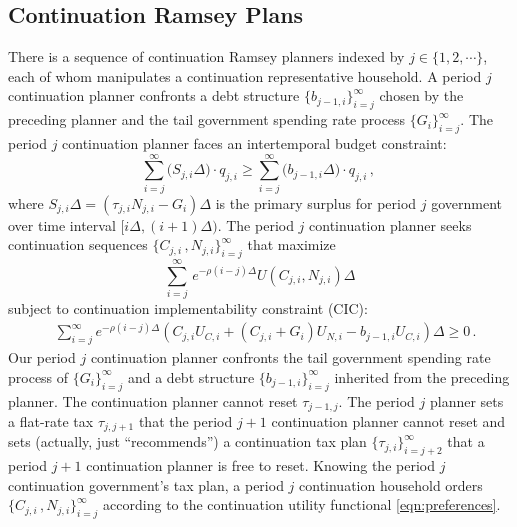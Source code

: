 \documentclass[12pt]{article}
\newcommand{\NW}[1]{{\textcolor{blue}{#1}}}
\newcommand{\TS}[1]{{\textcolor{magenta}{#1}}}
\begin{document}
	
	\subsection{Continuation Ramsey Plans} \label{subsec32}
	
	
	There is a sequence of continuation Ramsey planners indexed by $j\in \{1, 2, \cdots \}$, each of whom %
	manipulates   a  continuation representative household. %
	A period $j$ continuation planner  confronts a debt structure {$\{ b_{j-1,i}\}_{i=j}^\infty$} chosen by the preceding  planner and the tail government spending rate process {$\{ G_{i}\}_{i=j}^\infty$}. 
	The period $j$ continuation planner  faces an intertemporal budget constraint:
	\begin{equation}\label{ic} %
			\sum_{i=j}^\infty \big( S_{j,i} \Delta  \big) \cdot q_{j, i} \geq \sum_{i=j}^\infty \big({ b_{j-1, i} }\Delta \big) \cdot q_{j, i}  \,, \,  %
	\end{equation}
	where %
	$S_{j, i}\Delta=\left(\tau_{j, i}N_{j, i}-G_{i}\right)\Delta
	$ %
	is the primary  surplus for period $j$ government over time interval $[i \Delta, (i+1)\Delta )$.  
	The period $j$ continuation planner  seeks  continuation sequences    $\{ C_{j, i}\, , N_{j, i}\}_{i=j}^\infty$ that  maximize
	\begin{equation}\label{eqn:preferences}%
			\sum_{i=j}^\infty \, e^{-\rho (i-j)\Delta} U(C_{j, i}, N_{j, i}) \Delta  %
	\end{equation}
	subject to continuation implementability constraint (CIC): 
	\begin{align}\label{con_IC0}
		& \sum_{i=j}^{\infty} e^{-\rho(i-j) \Delta} \left(  C_{j, i}U_{C, i} + (C_{j, i}+G_{i})U_{N, i} -b_{j-1, i} U_{C, i} \right) \Delta \geq 0\, .
	\end{align}
	Our period $j$ continuation planner confronts the tail government spending rate process of {$\{ G_{i}\}_{i=j}^\infty$}  and  a debt structure {$\{ b_{j-1,i}\}_{i=j}^\infty$} inherited from the preceding  planner.
	The continuation planner cannot reset  {$\tau_{j-1, j}$}. The period $j$ planner  sets  a flat-rate tax {$\tau_{j, j+1}$} that the  period $j+1$ continuation planner {cannot} reset and sets (actually, just ``recommends'') a continuation tax plan  {$   \{\tau_{j, i}\}_{i=j+2}^{\infty} $} that  a  period $j+1$ continuation planner is free to reset.
	Knowing the period $j$ continuation government's tax plan, a period $j$  continuation household  orders $\{ C_{j, i}\, , N_{j, i}\}_{i=j}^\infty$ according to the continuation utility functional
	\eqref{eqn:preferences}.
	
\end{document}
